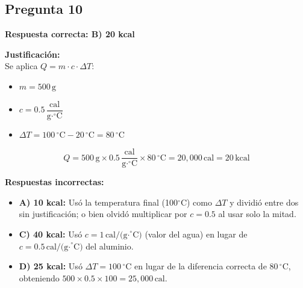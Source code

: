 \begin{respuestabox}
\subsection*{Pregunta 10}
\textcolor{verdecorrecto}{\textbf{Respuesta correcta: B) 20 kcal}}

\textbf{Justificación:}\\
Se aplica $Q = m \cdot c \cdot \Delta T$:
\begin{itemize}
    \item $m = 500\,\text{g}$
    \item $c = 0.5\,\dfrac{\text{cal}}{\text{g}\cdot^\circ\text{C}}$
    \item $\Delta T = 100\,^\circ\text{C} - 20\,^\circ\text{C} = 80\,^\circ\text{C}$
\end{itemize}

$$Q = 500\,\text{g} \times 0.5\,\frac{\text{cal}}{\text{g}\cdot^\circ\text{C}} \times 80\,^\circ\text{C} = 20{,}000\,\text{cal} = 20\,\text{kcal}$$

\textbf{Respuestas incorrectas:}
\begin{itemize}
    \item \textbf{A) 10 kcal:} Usó la temperatura final (100$^\circ$C) como $\Delta T$ y dividió entre dos sin justificación; o bien olvidó multiplicar por $c = 0.5$ al usar solo la mitad.
    \item \textbf{C) 40 kcal:} Usó $c = 1\,\text{cal/(g·}^\circ\text{C)}$ (valor del agua) en lugar de $c = 0.5\,\text{cal/(g·}^\circ\text{C)}$ del aluminio.
    \item \textbf{D) 25 kcal:} Usó $\Delta T = 100\,^\circ\text{C}$ en lugar de la diferencia correcta de $80\,^\circ\text{C}$, obteniendo $500 \times 0.5 \times 100 = 25{,}000\,\text{cal}$.
\end{itemize}
\end{respuestabox}
